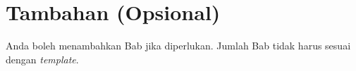 \chapter{Tambahan (Opsional)}

Anda boleh menambahkan Bab jika diperlukan. Jumlah Bab tidak harus sesuai dengan \textit{template}. 
